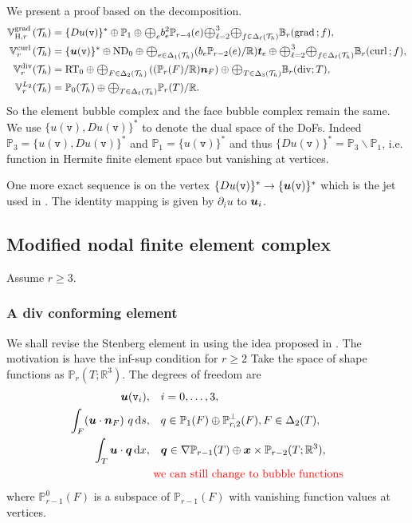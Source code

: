 \documentclass[10pt]{amsart}
\newcommand{\Oplus}{\ensuremath{\vcenter{\hbox{\scalebox{1.5}{$\oplus$}}}}}
\begin{document}
We present a proof based on the decomposition. 
\begin{align*}
\mathbb V^{\grad}_{{\rm H}, r}(\mathcal T_h) &= \{ Du(\texttt{v})\}^* \oplus \mathbb P_1\oplus \Oplus_e b_e^2 \mathbb P_{r-4}(e)\Oplus_{\ell = 2}^3\Oplus_{f\in \Delta_{\ell}(\mathcal T_h)} \mathbb B_{r}(\grad; f),\\
\mathbb V^{\curl}_r(\mathcal T_h) &= \{\bs u(\texttt{v})\}^* \oplus {\rm ND}_0 \oplus \Oplus_{e\in \Delta_1(\mathcal T_h)}(b_e\mathbb P_{r-2}(e)/\mathbb R) \bs t_e \oplus \Oplus_{\ell = 2}^3\Oplus_{f\in \Delta_{\ell}(\mathcal T_h)} \mathbb B_{r}(\curl; f),\\
\mathbb V^{\div}_r(\mathcal T_h) &= {\rm RT}_0\oplus \Oplus_{F\in \Delta_2(\mathcal T_h)}\left((\mathbb P_{r}(F)/\mathbb R)\bs n_F\right) \oplus \Oplus_{T\in \Delta_{3}(\mathcal T_h)} \mathbb B_{r}(\div; T),\\
\mathbb V^{L_2}_r(\mathcal T_h) &= \mathbb P_0(\mathcal T_h) \oplus \Oplus_{T\in \Delta_{\ell}(\mathcal T_h)} \mathbb P_r(T)/\mathbb R.
\end{align*}
So the element bubble complex and the face bubble complex remain the same. 
We use $\{u(\texttt{v}), Du(\texttt{v})\}^*$ to denote the dual space of the DoFs. 
Indeed $\mathbb P_3 = \{u(\texttt{v}), Du(\texttt{v})\}^*$ and $\mathbb P_1 = \{u(\texttt{v})\}^*$ and thus $\{Du(\texttt{v})\}^* = \mathbb P_3\backslash \mathbb P_1$, i.e. function in Hermite finite element space but vanishing at vertices. 

One more exact sequence is on the vertex $ \{ Du(\texttt{v})\}^* \to  \{ \boldsymbol u(\texttt{v})\}^*$ which is the jet used in \cite{ChristiansenHuHu2018}. The identity mapping is given by $\partial_i u$ to $\boldsymbol u_i$. 

\subsection{Modified nodal finite element complex}
Assume $r\geq 3$.
\subsubsection{A div conforming element}
We shall revise the Stenberg element in \cite{Stenberg2010} using the idea proposed in \cite{Chen;Huang:2020Discrete}. The motivation is have the inf-sup condition for $r\geq 2$
Take the space of shape functions as $\mathbb{P}_{r}(T;\mathbb R^3)$. The degrees of freedom are
\begin{align}
\label{eq:divdof1}
\boldsymbol u(\texttt{v}_i),& \quad i=0,\ldots, 3, \\
\label{eq:divdof2}
\int_F (\boldsymbol u\cdot \boldsymbol n_F)\ q \,{\rm d} s, &\quad q\in\mathbb P_{1}(F)\oplus\mathbb P_{r,2}^{\perp}(F), F\in\Delta_{2}(T),\\
\label{eq:divdof3}
\int_T \boldsymbol u\cdot \boldsymbol q \,{\rm d} x, &\quad \boldsymbol q\in\nabla\mathbb P_{r-1}(T)\oplus\boldsymbol x\times\mathbb P_{r-2}(T;\mathbb R^3), \\
& \textcolor{red}{\text{ we can still change to bubble functions}}
\end{align}
where $\mathbb P_{r-1}^0(F)$ is a subspace of $\mathbb P_{r-1}(F)$ with vanishing function values at vertices.
\end{document}
